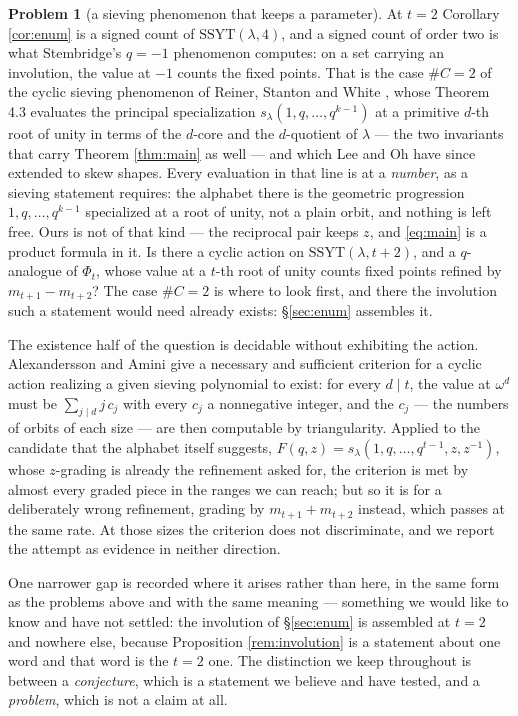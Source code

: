 \documentclass[11pt,reqno]{amsart}
\theoremstyle{plain}
\theoremstyle{definition}
\newtheorem{problem}[theorem]{Problem}
\begin{document}
\begin{problem}[a sieving phenomenon that keeps a parameter]\label{prob:sieving}
At $t=2$ Corollary \ref{cor:enum} is a signed count of $\mathrm{SSYT}(\lambda,4)$, and a signed count
of order two is what Stembridge's $q=-1$ phenomenon \cite{Ste94} computes: on a set carrying an
involution, the value at $-1$ counts the fixed points. That is the case $\#C=2$ of the cyclic sieving
phenomenon of Reiner, Stanton and White \cite{RSW04}, whose Theorem 4.3 evaluates the principal
specialization $s_\lambda(1,q,\dots,q^{k-1})$ at a primitive $d$-th root of unity in terms of the
$d$-core and the $d$-quotient of $\lambda$ --- the two invariants that carry Theorem \ref{thm:main}
as well --- and which Lee and Oh \cite{LO22} have since extended to skew shapes. Every evaluation in
that line is at a \emph{number}, as a sieving statement requires: the alphabet there is the geometric
progression $1,q,\dots,q^{k-1}$ specialized at a root of unity, not a plain orbit, and nothing is
left free. Ours is not of that kind --- the reciprocal pair keeps $z$, and \eqref{eq:main} is a
product formula in it. Is there a cyclic action on $\mathrm{SSYT}(\lambda,t+2)$, and a $q$-analogue of
$\Phi_t$, whose value at a $t$-th root of unity counts fixed points refined by $m_{t+1}-m_{t+2}$?
The case $\#C=2$ is where to look first, and there the involution such a statement would need already
exists: \S\ref{sec:enum} assembles it.

The existence half of the question is decidable without exhibiting the action. Alexandersson and
Amini \cite{AA19} give a necessary and sufficient criterion for a cyclic action realizing a given
sieving polynomial to exist: for every $d\mid t$, the value at $\omega^d$ must be
$\sum_{j\mid d}j\,c_j$ with every $c_j$ a nonnegative integer, and the $c_j$ --- the numbers of
orbits of each size --- are then computable by triangularity. Applied to the candidate that the
alphabet itself suggests, $F(q,z)=s_\lambda(1,q,\dots,q^{t-1},z,z^{-1})$, whose $z$-grading is
already the refinement asked for, the criterion is met by almost every graded piece in the ranges we
can reach; but so it is for a deliberately wrong refinement, grading by $m_{t+1}+m_{t+2}$ instead,
which passes at the same rate. At those sizes the criterion does not discriminate, and we report the
attempt as evidence in neither direction.
\end{problem}

One narrower gap is recorded where it arises rather than here, in the same form as the problems
above and with the same meaning --- something we would like to know and have not settled: the
involution of \S\ref{sec:enum} is assembled at $t=2$ and nowhere else, because Proposition
\ref{rem:involution} is a statement about one word and that word is the $t=2$ one. The distinction we
keep throughout is between a \emph{conjecture}, which is a statement we believe and have tested, and
a \emph{problem}, which is not a claim at all.
\end{document}
